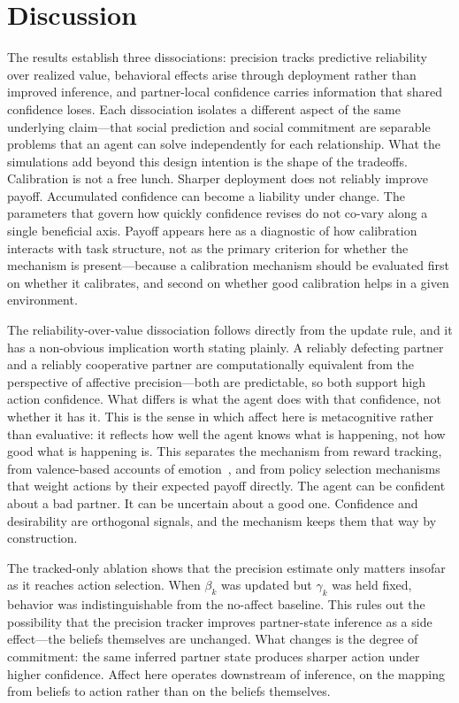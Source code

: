 \section{Discussion}
\label{sec:discussion}

The results establish three dissociations: precision tracks predictive reliability over realized value, behavioral effects arise through deployment rather than improved inference, and partner-local confidence carries information that shared confidence loses. Each dissociation isolates a different aspect of the same underlying claim---that social prediction and social commitment are separable problems that an agent can solve independently for each relationship. What the simulations add beyond this design intention is the shape of the tradeoffs. Calibration is not a free lunch. Sharper deployment does not reliably improve payoff. Accumulated confidence can become a liability under change. The parameters that govern how quickly confidence revises do not co-vary along a single beneficial axis. Payoff appears here as a diagnostic of how calibration interacts with task structure, not as the primary criterion for whether the mechanism is present---because a calibration mechanism should be evaluated first on whether it calibrates, and second on whether good calibration helps in a given environment.

The reliability-over-value dissociation follows directly from the update rule, and it has a non-obvious implication worth stating plainly. A reliably defecting partner and a reliably cooperative partner are computationally equivalent from the perspective of affective precision---both are predictable, so both support high action confidence. What differs is what the agent does with that confidence, not whether it has it. This is the sense in which affect here is metacognitive rather than evaluative: it reflects how well the agent knows what is happening, not how good what is happening is. This separates the mechanism from reward tracking, from valence-based accounts of emotion~\cite{Barrett2006EmotionParadox}, and from policy selection mechanisms that weight actions by their expected payoff directly. The agent can be confident about a bad partner. It can be uncertain about a good one. Confidence and desirability are orthogonal signals, and the mechanism keeps them that way by construction.

The tracked-only ablation shows that the precision estimate only matters insofar as it reaches action selection. When $\beta_k$ was updated but $\gamma_k$ was held fixed, behavior was indistinguishable from the no-affect baseline. This rules out the possibility that the precision tracker improves partner-state inference as a side effect---the beliefs themselves are unchanged. What changes is the degree of commitment: the same inferred partner state produces sharper action under higher confidence. Affect here operates downstream of inference, on the mapping from beliefs to action rather than on the beliefs themselves.

